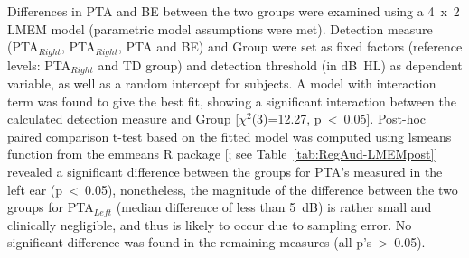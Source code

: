 \documentclass[a4paper, twoside]{templates/ociamthesis}
\begin{document}
Differences in PTA and BE between the two groups were examined using a 4~x~2 LMEM model (parametric model assumptions were met). Detection measure (PTA\(_{Right}\), PTA\(_{Right}\), PTA and BE) and Group were set as fixed factors (reference levels: PTA\(_{Right}\) and TD group) and detection threshold (in dB~HL) as dependent variable, as well as a random intercept for subjects. A model with interaction term was found to give the best fit, showing a significant interaction between the calculated detection measure and Group {[}\(\chi^2\)(3)=12.27, p~\textless~0.05{]}. Post-hoc paired comparison t-test based on the fitted model was computed using lsmeans function from the emmeans R package {[}\textcite{emmeansPackageR}; see Table~\ref{tab:RegAud-LMEMpost}{]} revealed a significant difference between the groups for PTA's measured in the left ear (p~\textless~0.05), nonetheless, the magnitude of the difference between the two groups for PTA\(_{Left}\) (median difference of less than 5~dB) is rather small and clinically negligible, and thus is likely to occur due to sampling error. No significant difference was found in the remaining measures (all p's~\textgreater~0.05).



\begin{table}

\caption{\label{tab:RegAud-LMEMpost}Post-hoc paired comparison t-test for PTA x Group. The test was performed on the fitted LMEM model and included adjusted least-squared-mean for the random intercept (subjects) using lsmeans package (REF).}
\centering
{}
\end{table}
\end{document}
